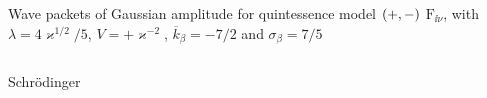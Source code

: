 \documentclass[8pt]{beamer}
\begin{document}
\begin{frame}%
{Wave packets of Gaussian amplitude for quintessence model ${\left(+,-\right)}$}%
{$\mathrm{F}_{\ii\nu}$, with $\lambda = 4\varkappa^{1/2}/5$,
$V = +\varkappa^{-2}$, $\overline{k}_\beta = -7/2$ and $\sigma_\beta = 7/5$}
\begin{columns}
\begin{column}{.49\textwidth}
\begin{block}{Schrödinger}

\end{block}
\end{column}
\end{columns}
\end{frame}
\end{document}
